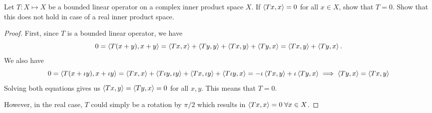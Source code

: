 \begin{question}
    Let $T:X\mapsto X$ be a bounded linear operator on a complex inner product space $X$. If $\left\langle Tx , x \right\rangle = 0$ for all $x \in X$, show that $T= 0$. Show that this does not hold in case of a real inner product space.
    \label{section3.2-10}
\end{question}
\begin{proof}
    First, since $T$ is a bounded linear operator, we have
    \[0 = \left\langle T(x+y) , x+y \right\rangle = \left\langle Tx , x \right\rangle + \left\langle Ty , y \right\rangle + \left\langle Tx , y \right\rangle + \left\langle Ty , x \right\rangle = \left\langle Tx , y \right\rangle + \left\langle Ty , x \right\rangle.\]
    We also have
    \[0 = \left\langle T(x+\iota y) , x + \iota y \right\rangle = \left\langle Tx , x \right\rangle + \left\langle T \iota y , \iota y \right\rangle + \left\langle Tx , \iota y \right\rangle + \left\langle T \iota y , x \right\rangle = -\iota \left\langle Tx , y \right\rangle + \iota \left\langle Ty , x \right\rangle \implies \left\langle Ty , x \right\rangle = \left\langle Tx , y \right\rangle\]
    Solving both equations gives us $\left\langle Tx , y \right\rangle = \left\langle Ty , x \right\rangle = 0$ for all $x, y$. This means that $T = 0$.

    However, in the real case, $T$ could simply be a rotation by $\pi/2$ which results in $\left\langle Tx , x \right\rangle = 0 \;\forall x \in X$.
\end{proof}